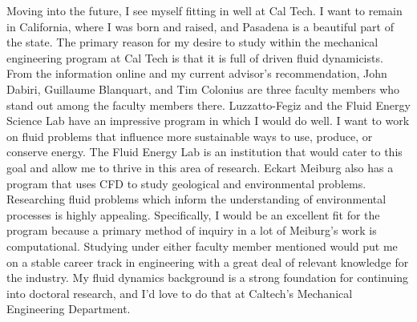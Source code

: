 \documentclass{article}
\begin{document}
Moving into the future, I see myself fitting in well at Cal Tech. I want to remain in California, where I was born and raised, and Pasadena is a beautiful part of the state. The primary reason for my desire to study within the mechanical engineering program at Cal Tech is that it is full of driven fluid dynamicists. From the information online and my current advisor's recommendation, John Dabiri, Guillaume Blanquart, and Tim Colonius are three faculty members who stand out among the faculty members there. Luzzatto-Fegiz and the Fluid Energy Science Lab have an impressive program in which I would do well. I want to work on fluid problems that influence more sustainable ways to use, produce, or conserve energy. The Fluid Energy Lab is an institution that would cater to this goal and allow me to thrive in this area of research. Eckart Meiburg also has a program that uses CFD to study geological and environmental problems. Researching fluid problems which inform the understanding of environmental processes is highly appealing. Specifically, I would be an excellent fit for the program because a primary method of inquiry in a lot of Meiburg's work is computational. Studying under either faculty member mentioned would put me on a stable career track in engineering with a great deal of relevant knowledge for the industry. My fluid dynamics background is a strong foundation for continuing into doctoral research, and I'd love to do that at Caltech's Mechanical Engineering Department.
\end{document}
